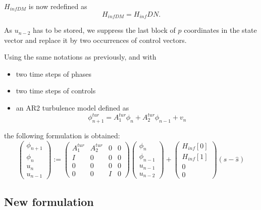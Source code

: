 \documentclass[a4,10pt]{article}
\begin{document}
$H_{infDM}$ is now redefined as
\begin{equation}
H_{infDM}=H_{inf}DN.
\end{equation}

As $u_{n-2}$ has to be stored, we suppress the last block of $p$
coordinates in the state vector and replace it by two occurrences of
control vectors.

Using the same notations as previously, and with
\begin{itemize}
\item two time steps of phases
\item two time steps of controls
\item an AR2 turbulence model defined as
\begin{equation}
\phi_{n+1}^{tur}=A_{1}^{tur}\phi_n+A_2^{tur}\phi_{n-1}+v_n
\end{equation}
\end{itemize}
the following formulation is obtained:
\begin{equation}
\begin{pmatrix}
\phi_{n+1} \\
\phi_n \\
u_n\\
u_{n-1} \end{pmatrix}
:=\begin{pmatrix}A^{tur}_1 &A^{tur}_2&0&0\\
I&0&0&0\\
0&0&0&0\\
0&0&I&0\end{pmatrix}\begin{pmatrix}
\phi_{n}\\
\phi_{n-1}\\
u_{n-1}\\
u_{n-2}\end{pmatrix}+\begin{pmatrix}H_{inf}[0]\\H_{inf}[1]\\0\\0\end{pmatrix}(s-\hat{s})
\label{eq:newform}
\end{equation}

\subsection{New formulation}
\end{document}
